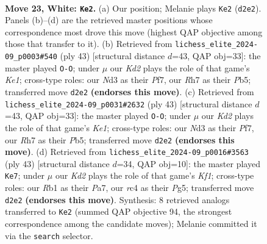 \documentclass[11pt]{article}
\begin{document}
\clearpage

\begin{figure}[p]\centering
\begin{subfigure}{0.46\textwidth}\centering
\resizebox{\linewidth}{!}{%
\newchessgame
\chessboard[
  setfen={2kr4/ppp4R/8/4pp2/2r5/3N4/PP1K1P1P/1R6 w - - 0 23},
  showmover=false,
  pgfstyle=straightmove, color=movearrow, markmove={d2-e2}
]}
\caption{}
\end{subfigure}\hfill
\begin{subfigure}{0.46\textwidth}\centering
\resizebox{\linewidth}{!}{%
\newchessgame
\chessboard[
  setfen={4k2r/2R2ppp/p7/1p2P3/8/8/PP1r1PPP/5RK1 b k - 0 22},
  showmover=false,
  pgfstyle=straightmove, color=movearrow, markmove={e8-g8}
]}
\caption{}
\end{subfigure}
\\[4pt]
\begin{subfigure}{0.46\textwidth}\centering
\resizebox{\linewidth}{!}{%
\newchessgame
\chessboard[
  setfen={4k2r/2R2ppp/p7/1p2P3/8/8/PP1r1PPP/5RK1 b k - 0 22},
  showmover=false,
  pgfstyle=straightmove, color=movearrow, markmove={e8-g8}
]}
\caption{}
\end{subfigure}\hfill
\begin{subfigure}{0.46\textwidth}\centering
\resizebox{\linewidth}{!}{%
\newchessgame
\chessboard[
  setfen={rn1R1k2/pp4p1/2p1p3/6p1/8/7P/PPP2PP1/5RK1 b - - 1 22},
  showmover=false,
  pgfstyle=straightmove, color=movearrow, markmove={f8-e7}
]}
\caption{}
\end{subfigure}
\caption{\textbf{Move 23, White: \texttt{Ke2}.} (a) Our position; Melanie plays \texttt{Ke2} (\texttt{d2e2}). Panels (b)--(d) are the retrieved master positions whose correspondence most drove this move (highest QAP objective among those that transfer to it). (b) Retrieved from \texttt{lichess\_elite\_2024-09\_p0003\#540} (ply 43) [structural distance $d$=43, QAP obj=33]: the master played \texttt{O-O}; under $\mu$ our \emph{Kd2} plays the role of that game's \emph{Ke1}; cross-type roles: our \emph{N}d3 as their \emph{P}f7, our \emph{R}h7 as their \emph{P}b5; transferred move \texttt{d2e2} \textbf{(endorses this move)}. (c) Retrieved from \texttt{lichess\_elite\_2024-09\_p0031\#2632} (ply 43) [structural distance $d$=43, QAP obj=33]: the master played \texttt{O-O}; under $\mu$ our \emph{Kd2} plays the role of that game's \emph{Ke1}; cross-type roles: our \emph{N}d3 as their \emph{P}f7, our \emph{R}h7 as their \emph{P}b5; transferred move \texttt{d2e2} \textbf{(endorses this move)}. (d) Retrieved from \texttt{lichess\_elite\_2024-09\_p0016\#3563} (ply 43) [structural distance $d$=34, QAP obj=10]: the master played \texttt{Ke7}; under $\mu$ our \emph{Kd2} plays the role of that game's \emph{Kf1}; cross-type roles: our \emph{R}b1 as their \emph{P}a7, our \emph{r}c4 as their \emph{P}g5; transferred move \texttt{d2e2} \textbf{(endorses this move)}. Synthesis: 8 retrieved analogs transferred to \texttt{Ke2} (summed QAP objective 94, the strongest correspondence among the candidate moves); Melanie committed it via the \texttt{search} selector.}
\label{fig:thought-m44}
\end{figure}
\end{document}
